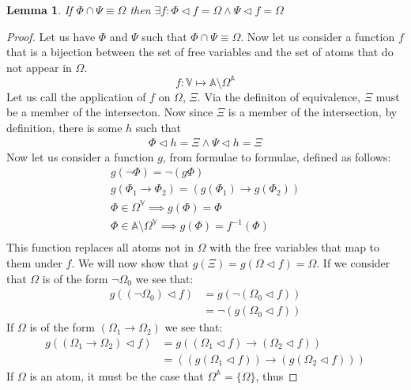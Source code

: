 \documentclass{article}
\newtheorem{lem}{Lemma}
\begin{document}
\begin{lem}
If $\Phi \cap \Psi \equiv \Omega$ then $\exists f: \Phi \lhd f = \Omega \land \Psi \lhd f = \Omega$
\end{lem}
\begin{proof}
Let us have $\Phi$ and $\Psi$ such that $\Phi \cap \Psi \equiv \Omega$.
Now let us consider a function $f$ that is a bijection between the set of free variables and the set of atoms that do not appear in $\Omega$.
\begin{equation*}
f : \mathbb{V} \mapsto \mathbb{A}\setminus\Omega^{\mathbb{A}}
\end{equation*}
Let us call the application of $f$ on $\Omega$, $\Xi$.
Via the definiton of equivalence, $\Xi$ must be a member of the intersecton.
Now since $\Xi$ is a member of the intersection, by definition, there is some $h$ such that
\begin{align*}
\Phi \lhd h = \Xi \land \Psi \lhd h = \Xi
\end{align*}
Now let us consider a function $g$, from formulae to formulae, defined as follows:
\begin{gather*}
g (\neg\Phi) = \neg (g \Phi) \\
g (\Phi_1 \rightarrow \Phi_2) = (g(\Phi_1)\rightarrow g(\Phi_2)) \\
\Phi \in \Omega^{\mathbb{V}} \implies g(\Phi) = \Phi\\
\Phi \in \mathbb{A}\setminus \Omega^{\mathbb{V}} \implies g(\Phi) = f^{-1} (\Phi)\\
\end{gather*}
This function replaces all atoms not in $\Omega$ with the free variables that map to them under $f$.
We will now show that $g (\Xi) = g (\Omega \lhd f) = \Omega$.
If we consider that $\Omega$ is of the form $\neg \Omega_0$ we see that:
\begin{align*}
   g ((\neg \Omega_0) \lhd f)
&= g (\neg (\Omega_0 \lhd f)) \tag{Definition of Assignment}\\
&= \neg(g (\Omega_0 \lhd f))  \tag{Definition of $g$}       
\end{align*}
If $\Omega$ is of the form $(\Omega_1 \rightarrow \Omega_2)$ we see that:
\begin{align*}
   g ((\Omega_1 \rightarrow \Omega_2) \lhd f)
&= g ((\Omega_1 \lhd f) \rightarrow (\Omega_2 \lhd f))      \tag{Definition of Assignment} \\
&=((g (\Omega_1 \lhd f)) \rightarrow (g (\Omega_2 \lhd f))) \tag{Definition of $g$}
\end{align*}
If $\Omega$ is an atom, it must be the case that $\Omega^\mathbb{A} =\{\Omega\}$, thus

\end{proof}
\end{document}
